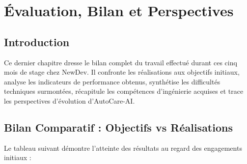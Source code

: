 \documentclass[12pt,a4paper,oneside]{report}
\begin{document}
\clearpage
\chapter{\'Evaluation, Bilan et Perspectives}

\section{Introduction}
Ce dernier chapitre dresse le bilan complet du travail effectu\'e durant ces cinq mois de stage chez NewDev. Il confronte les r\'ealisations aux objectifs initiaux, analyse les indicateurs de performance obtenus, synth\'etise les difficult\'es techniques surmont\'ees, r\'ecapitule les comp\'etences d'ing\'enierie acquises et trace les perspectives d'\'evolution d'AutoCare-AI.

\section{Bilan Comparatif : Objectifs vs R\'ealisations}
Le tableau suivant d\'emontre l'atteinte des r\'esultats au regard des engagements initiaux :
\end{document}
